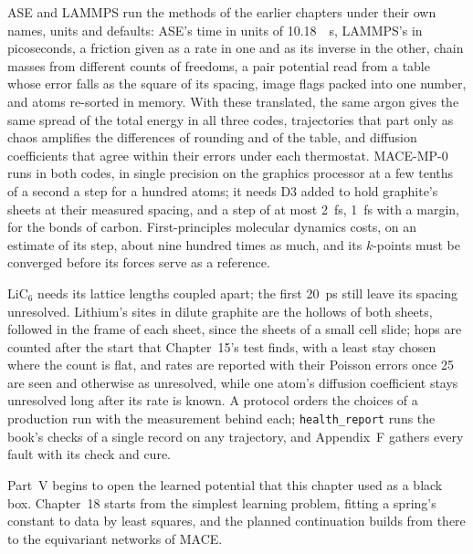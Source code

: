 
ASE and LAMMPS run the methods of the earlier chapters under their own
names, units and defaults: ASE's time in units of \SI{10.18}{\femto
\second}, LAMMPS's in picoseconds, a friction given as a rate in one and
as its inverse in the other, chain masses from different counts of
freedoms, a pair potential read from a table whose error falls as the
square of its spacing, image flags packed into one number, and atoms
re-sorted in memory. With these translated, the same argon gives the same
spread of the total energy in all three codes, trajectories that part
only as chaos amplifies the differences of rounding and of the table,
and diffusion coefficients that agree within their errors under each
thermostat.
MACE-MP-0 runs in both codes, in single precision on the
graphics processor at a few tenths of a second a step for a hundred atoms;
it needs D3 added to hold graphite's sheets at their measured spacing,
and a step of at most \SI{2}{\femto\second}, \SI{1}{\femto\second} with a
margin, for the bonds of carbon. First-principles molecular dynamics
costs, on an estimate of its step, about nine hundred times as much, and
its
$k$-points must be converged before its forces serve as a reference.

LiC$_6$ needs its lattice lengths coupled apart; the first
\SI{20}{\pico\second} still leave its spacing unresolved. Lithium's sites in dilute graphite are the
hollows of both sheets, followed in the frame of each sheet, since the
sheets of a small cell slide; hops are counted after the start that
Chapter~15's test finds, with a least stay chosen where the count is
flat, and rates are reported with their Poisson errors once 25 are seen
and otherwise as unresolved, while one atom's
diffusion coefficient stays unresolved long after its rate is known.
A protocol orders the choices of a production run with the measurement
behind each; \texttt{health\_report} runs the book's checks of a single
record on any trajectory, and Appendix~F gathers every fault with its
check and cure.

Part~V begins to open the learned potential that this chapter used as a black
box. Chapter~18 starts from the simplest learning problem, fitting a
spring's constant to data by least squares, and the planned continuation
builds from there to the equivariant networks of MACE.
